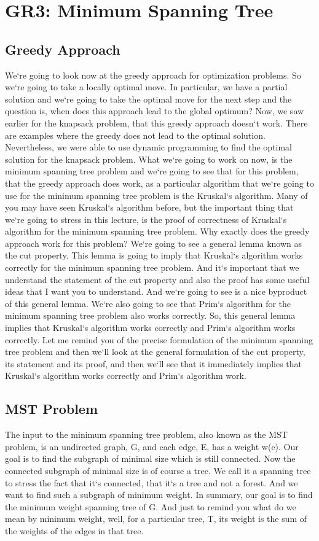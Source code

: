 \section{GR3: Minimum Spanning Tree}

\subsection{Greedy Approach}
We`re going to look now at the greedy approach for optimization problems.
So we`re going to take a locally optimal move.
In particular, we have a partial solution and we`re going to take the optimal move for the next step and the question is, when does this approach lead to the global optimum? Now, we saw earlier for the knapsack problem, that this greedy approach doesn`t work.
There are examples where the greedy does not lead to the optimal solution.
Nevertheless, we were able to use dynamic programming to find the optimal solution for the knapsack problem.
What we`re going to work on now, is the minimum spanning tree problem and we`re going to see that for this problem, that the greedy approach does work, as a particular algorithm that we`re going to use for the minimum spanning tree problem is the Kruskal`s algorithm.
Many of you may have seen Kruskal`s algorithm before, but the important thing that we`re going to stress in this lecture, is the proof of correctness of Kruskal`s algorithm for the minimum spanning tree problem.
Why exactly does the greedy approach work for this problem? We`re going to see a general lemma known as the cut property.
This lemma is going to imply that Kruskal`s algorithm works correctly for the minimum spanning tree problem.
And it`s important that we understand the statement of the cut property and also the proof has some useful ideas that I want you to understand.
And we`re going to see is a nice byproduct of this general lemma.
We`re also going to see that Prim`s algorithm for the minimum spanning tree problem also works correctly.
So, this general lemma implies that Kruskal`s algorithm works correctly and Prim`s algorithm works correctly.
Let me remind you of the precise formulation of the minimum spanning tree problem and then we`ll look at the general formulation of the cut property, its statement and its proof, and then we`ll see that it immediately implies that Kruskal`s algorithm works correctly and Prim`s algorithm work.

\subsection{MST Problem}
The input to the minimum spanning tree problem, also known as the MST problem, is an undirected graph, G, and each edge, E, has a weight w(e).
Our goal is to find the subgraph of minimal size which is still connected.
Now the connected subgraph of minimal size is of course a tree.
We call it a spanning tree to stress the fact that it`s connected, that it`s a tree and not a forest.
And we want to find such a subgraph of minimum weight.
In summary, our goal is to find the minimum weight spanning tree of G\@.
And just to remind you what do we mean by minimum weight, well, for a particular tree, T, its weight is the sum of the weights of the edges in that tree.

